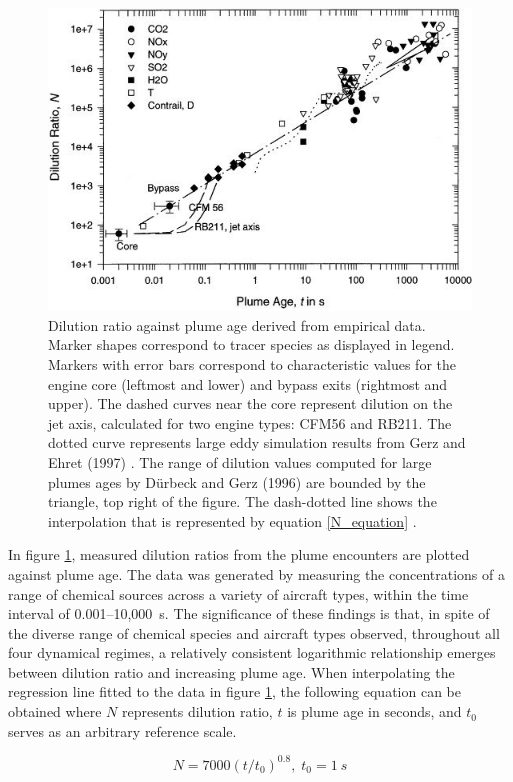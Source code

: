\begin{figure}[H]
 \centering
 \includegraphics[width=0.75\linewidth]{Schumann_fig.jpg}
 \caption{Dilution ratio against plume age derived from empirical data. Marker shapes correspond to tracer species as displayed in legend. Markers with error bars correspond to characteristic values for the engine core (leftmost and lower) and bypass exits (rightmost and upper). The dashed curves near the core represent dilution on the jet axis, calculated for two engine types: CFM56 and RB211. The dotted curve represents large eddy simulation results from Gerz and Ehret (1997) \cite{Gerz1997}. The range of dilution values computed for large plumes ages by D{\"u}rbeck and Gerz (1996) \cite{Durbeck1996} are bounded by the triangle, top right of the figure. The dash-dotted line shows the interpolation that is represented by equation \eqref{N_equation} \cite{Schumann1998}.}
 \label{Schumann_dilution}
 \end{figure}

In figure \ref{Schumann_dilution}, measured dilution ratios from the plume encounters are plotted against plume age. The data was generated by measuring the concentrations of a range of chemical sources across a variety of aircraft types, within the time interval of 0.001--10,000~s. The significance of these findings is that, in spite of the diverse range of chemical species and aircraft types observed, throughout all four dynamical regimes, a relatively consistent logarithmic relationship emerges between dilution ratio and increasing plume age. When interpolating the regression line fitted to the data in figure \ref{Schumann_dilution}, the following equation can be obtained where $N$ represents dilution ratio, $t$ is plume age in seconds, and $t_0$ serves as an arbitrary reference scale.

\begin{equation}
	N = 7000(t/t_0)^{0.8}, \; 	t_0 = 1~s 
	\label{N_equation}
	\end{equation}
	
